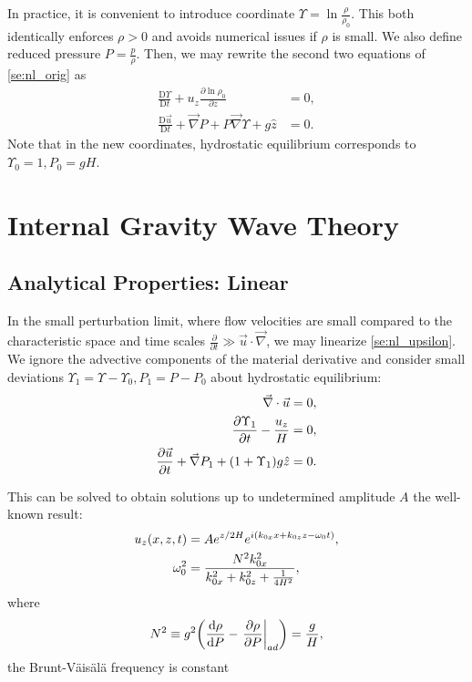 \documentclass[twocolumn,
        nofootinbib, %
        usenames, %
        aps,
        prd,
        dvipsnames %
    ]{revtex4-1}%
\newcommand*{\rd}[2]{\frac{\mathrm{d}#1}{\mathrm{d}#2}}
\newcommand*{\pd}[2]{\frac{\partial#1}{\partial#2}}
\newcommand*{\md}[2]{\frac{\mathrm{D}#1}{\mathrm{D}#2}}
\newcommand*{\at}[1]{\left.#1\right|}
\DeclarePairedDelimiter\p{\lparen}{\rparen}
\begin{document}
In practice, it is convenient to introduce coordinate $\Upsilon = \ln
\frac{\rho}{\rho_0}$. This both identically enforces $\rho > 0$ and avoids
numerical issues if $\rho$ is small. We also define reduced pressure $P =
\frac{p}{\rho}$. Then, we may rewrite the second two equations of
\autoref{se:nl_orig} as
\begin{subequations}\label{se:nl_upsilon}
    \begin{align}
        \md{\Upsilon}{t} + u_z \pd{\ln \rho_0}{z} &= 0,\label{eq:nl_up_density}
            \\
        \md{\vec{u}}{t} + \vec{\nabla}P + P\vec{\nabla}\Upsilon + g\hat{z} &= 0.
    \end{align}
\end{subequations}
Note that in the new coordinates, hydrostatic equilibrium corresponds to
$\Upsilon_0 = 1, P_0 = gH$.

\section{Internal Gravity Wave Theory}\label{s:theory}

\subsection{Analytical Properties: Linear}

In the small perturbation limit, where flow velocities are small compared to the
characteristic space and time scales $\pd{}{t} \gg \vec{u} \cdot \vec{\nabla}$,
we may linearize \autoref{se:nl_upsilon}. We ignore the advective components of the
material derivative and consider small deviations $\Upsilon_1 = \Upsilon -
\Upsilon_0, P_1 = P - P_0$ about hydrostatic equilibrium:
\begin{subequations}\label{se:lin_homo}
    \begin{align}
        \vec{\nabla} \cdot \vec{u} &= 0,\\
        \pd{\Upsilon_1}{t} - \frac{u_{z}}{H} &= 0,\\
        \pd{\vec{u}}{t} + \vec{\nabla}P_1
            + \p*{1 + \Upsilon_1} g\hat{z}
            &= 0.
    \end{align}
\end{subequations}

This can be solved to obtain solutions up to undetermined amplitude $A$ the
well-known result\cite{drazin,sutherland0}:
\begin{subequations}\label{se:lin_sol}
    \begin{align}
        u_z\p*{x, z, t} &= Ae^{z/2H}e^{i(k_{0x}x + k_{0z}z - \omega_0 t)},\\
        \omega_0^2 &= \frac{N^2k_{0x}^2}{k_{0x}^2 + k_{0z}^2 + \frac{1}{4H^2}},
            \label{eq:disp_rel}
    \end{align}
\end{subequations}
where
\begin{equation}
    N^2 \equiv g^2\p*{\rd{\rho}{P} - \at{\pd{\rho}{P}}_{ad}}
        = \frac{g}{H},
\end{equation}
the Brunt-V\"ais\"al\"a frequency is constant
\end{document}
